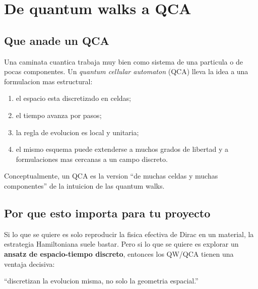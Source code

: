 \section{De quantum walks a QCA}

\subsection{Que anade un QCA}

Una caminata cuantica trabaja muy bien como sistema de una particula o de pocas componentes. Un \emph{quantum cellular automaton} (QCA) lleva la idea a una formulacion mas estructural:

\begin{enumerate}[leftmargin=*]
  \item el espacio esta discretizado en celdas;
  \item el tiempo avanza por pasos;
  \item la regla de evolucion es local y unitaria;
  \item el mismo esquema puede extenderse a muchos grados de libertad y a formulaciones mas cercanas a un campo discreto.
\end{enumerate}

Conceptualmente, un QCA es la version \enquote{de muchas celdas y muchas componentes} de la intuicion de las quantum walks.

\subsection{Por que esto importa para tu proyecto}

Si lo que se quiere es solo reproducir la fisica efectiva de Dirac en un material, la estrategia Hamiltoniana suele bastar. Pero si lo que se quiere es explorar un \textbf{ansatz de espacio-tiempo discreto}, entonces los QW/QCA tienen una ventaja decisiva:

\begin{displayquote}
\enquote{discretizan la evolucion misma, no solo la geometria espacial.}
\end{displayquote}

